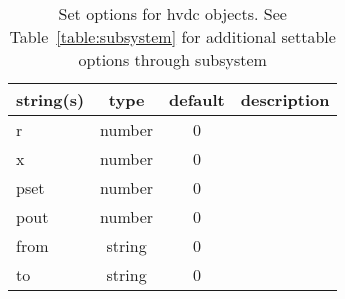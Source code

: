 \begin{table}[ht]
\centering
\begin{tabular}{p{5cm} c c p{7cm}}
\hline
string(s) & type & default & description \\
\hline
r & number & 0 & \\
x & number & 0 & \\
pset & number & 0 & \\
pout & number & 0 & \\
from & string & 0 & \\
to & string & 0 & \\
\hline
\end{tabular}
\caption{Set options for hvdc objects. See Table~\ref{table:subsystem} for additional settable options through subsystem}
\label{table:hvdc}
\end{table}
